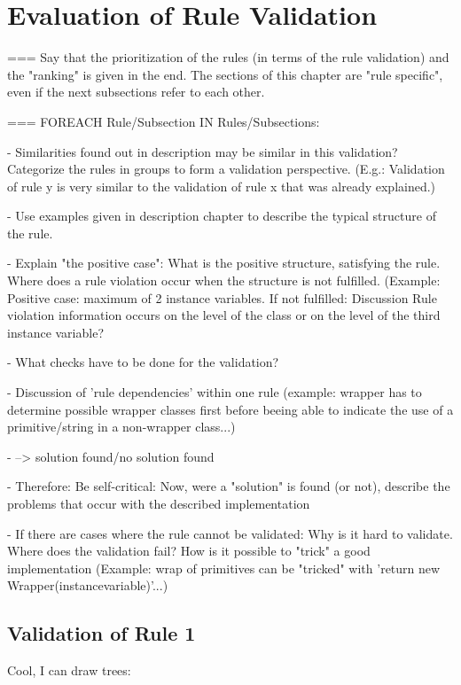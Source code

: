 \section{Evaluation of Rule Validation}
\label{e:evaluation}
=== Say that the prioritization of the rules (in terms of the rule validation) and the "ranking" is given in the end. The sections of this chapter are "rule specific", even if the next subsections refer to each other.

=== FOREACH Rule/Subsection IN Rules/Subsections:

 - Similarities found out in description may be similar in this validation? Categorize the rules in groups to form a validation perspective. (E.g.: Validation of rule y is very similar to the validation of rule x that was already explained.)
  
 - Use examples given in description chapter to describe the typical structure of the rule. 
 
 - Explain "the positive case": What is the positive structure, satisfying the rule. Where does a rule violation occur when the structure is not fulfilled. (Example: Positive case: maximum of 2 instance variables. If not fulfilled: Discussion Rule violation information occurs on the level of the class or on the level of the third instance variable?
 
 - What checks have to be done for the validation?
 
 - Discussion of 'rule dependencies' within one rule (example: wrapper has to determine possible wrapper classes first before beeing able to indicate the use of a primitive/string in a non-wrapper class...)
 
  - --> solution found/no solution found
 
  - Therefore: Be self-critical: Now, were a "solution" is found (or not), describe the problems that occur with the described implementation
  
 - If there are cases where the rule cannot be validated: Why is it hard to validate. Where does the validation fail? How is it possible to "trick" a good implementation (Example: wrap of primitives can be "tricked" with 'return new Wrapper(instancevariable)'...) 

\subsection{Validation of Rule 1}
Cool, I can draw trees: 

